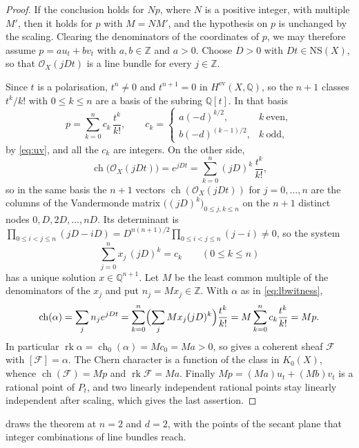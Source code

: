\documentclass[11pt,reqno]{amsart}
\theoremstyle{plain}
\theoremstyle{definition}
\theoremstyle{remark}
\newcommand{\QQ}{\mathbb{Q}}
\newcommand{\ZZ}{\mathbb{Z}}
\newcommand{\cF}{\mathcal{F}}
\newcommand{\cO}{\mathcal{O}}
\newcommand{\NS}{\mathrm{NS}}
\DeclareMathOperator{\ch}{ch}
\DeclareMathOperator{\rk}{rk}
\begin{document}
\begin{proof}
If the conclusion holds for $Np$, where $N$ is a positive integer, with
multiple $M'$, then it holds for $p$ with $M=NM'$, and the hypothesis on $p$
is unchanged by the scaling. Clearing the denominators of the coordinates of
$p$, we may therefore assume $p=au_{t}+bv_{t}$ with $a,b\in\ZZ$ and $a>0$.
Choose $D>0$ with $Dt\in\NS(X)$, so that $\cO_{X}(jDt)$ is a line bundle for
every $j\in\ZZ$.

Since $t$ is a polarisation, $t^{n}\ne0$ and $t^{n+1}=0$ in
$H^{\mathrm{ev}}(X,\QQ)$, so the $n+1$ classes $t^{k}/k!$ with $0\le k\le n$
are a basis of the subring $\QQ[t]$. In that basis
\[
  p=\sum_{k=0}^{n}c_{k}\,\frac{t^{k}}{k!},\qquad
  c_{k}=\begin{cases}a(-d)^{k/2}, & k\ \text{even},\\[2pt]
                     b(-d)^{(k-1)/2}, & k\ \text{odd},\end{cases}
\]
by \eqref{eq:uv}, and all the $c_{k}$ are integers. On the other
side,
\[
  \ch\bigl(\cO_{X}(jDt)\bigr)=e^{jDt}=\sum_{k=0}^{n}(jD)^{k}\,\frac{t^{k}}{k!},
\]
so in the same basis the $n+1$ vectors $\ch(\cO_{X}(jDt))$ for $j=0,\dots,n$
are the columns of the Vandermonde matrix $\bigl((jD)^{k}\bigr)_{0\le j,k\le n}$
on the $n+1$ distinct nodes $0,D,2D,\dots,nD$. Its determinant is
$\prod_{0\le i<j\le n}(jD-iD)=D^{n(n+1)/2}\prod_{0\le i<j\le n}(j-i)\ne0$, so
the system
\[
  \sum_{j=0}^{n}x_{j}\,(jD)^{k}=c_{k}\qquad(0\le k\le n)
\]
has a unique solution $x\in\QQ^{n+1}$. Let $M$ be the least common multiple of
the denominators of the $x_{j}$ and put $n_{j}=Mx_{j}\in\ZZ$. With $\alpha$ as
in \eqref{eq:lbwitness},
\[
  \ch(\alpha)=\sum_{j}n_{j}e^{jDt}
  =\sum_{k=0}^{n}\Bigl(\sum_{j}Mx_{j}(jD)^{k}\Bigr)\frac{t^{k}}{k!}
  =M\sum_{k=0}^{n}c_{k}\frac{t^{k}}{k!}=Mp .
\]
In particular $\rk\alpha=\ch_{0}(\alpha)=Mc_{0}=Ma>0$, so 
gives a coherent sheaf $\cF$ with $[\cF]=\alpha$. The Chern character is a
function of the class in $K_{0}(X)$, whence $\ch(\cF)=Mp$ and $\rk\cF=Ma$.
Finally $Mp=(Ma)u_{t}+(Mb)v_{t}$ is a rational point of $P_{t}$, and two
linearly independent rational points stay linearly independent after scaling,
which gives the last assertion.
\end{proof}

 draws the theorem at $n=2$ and $d=2$, with the points of
the secant plane that integer combinations of line bundles reach.
\end{document}
